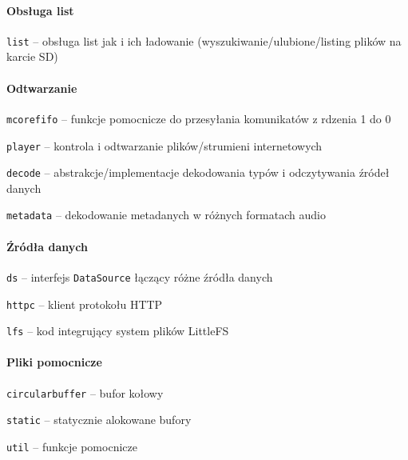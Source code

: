 \documentclass[12pt]{report}
\let\tempone\itemize
\let\temptwo\enditemize
\renewenvironment{itemize}{\tempone\setlength{\itemsep}{0cm}}{\temptwo}
\begin{document}
	\paragraph{Obsługa list}
	\begin{itemize}
		\item \lstinline|list| -- obsługa list jak i ich ładowanie (wyszukiwanie/ulubione/listing plików na karcie SD)
	\end{itemize}
	
	\paragraph{Odtwarzanie}
	\begin{itemize}
		\item \lstinline|mcorefifo| -- funkcje pomocnicze do przesyłania komunikatów z rdzenia 1 do 0
		\item \lstinline|player| -- kontrola i odtwarzanie plików/strumieni internetowych
		\begin{itemize}
			\item \lstinline|decode| -- abstrakcje/implementacje dekodowania typów i odczytywania źródeł danych
			\item \lstinline|metadata| -- dekodowanie metadanych w różnych formatach audio
		\end{itemize}
	\end{itemize}

	\paragraph{Źródła danych}
	\begin{itemize}
		\item \lstinline|ds| -- interfejs \lstinline|DataSource| łączący różne źródła danych
		\item \lstinline|httpc| -- klient protokołu HTTP
		\item \lstinline|lfs| -- kod integrujący system plików LittleFS\textsuperscript{\cite{littlefs}}
	\end{itemize}

	\paragraph{Pliki pomocnicze}
	\begin{itemize}
		\item \lstinline|circularbuffer| -- bufor kołowy
		\item \lstinline|static| -- statycznie alokowane bufory
		\item \lstinline|util| -- funkcje pomocnicze
	\end{itemize}
\end{document}
